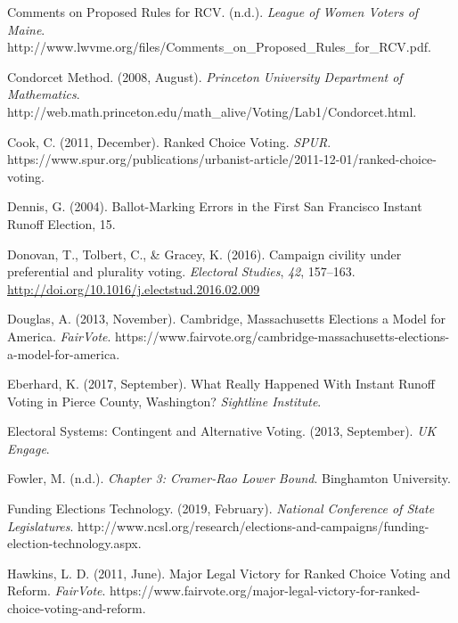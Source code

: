 \documentclass[12pt,twoside]{reedthesis}
\begin{document}
\leavevmode\hypertarget{ref-noauthor_comments_nodate}{}%
Comments on Proposed Rules for RCV. (n.d.). \emph{League of Women Voters of Maine}. http://www.lwvme.org/files/Comments\_on\_Proposed\_Rules\_for\_RCV.pdf.

\leavevmode\hypertarget{ref-noauthor_condorcet_2008}{}%
Condorcet Method. (2008, August). \emph{Princeton University Department of Mathematics}. http://web.math.princeton.edu/math\_alive/Voting/Lab1/Condorcet.html.

\leavevmode\hypertarget{ref-cook_ranked_2011}{}%
Cook, C. (2011, December). Ranked Choice Voting. \emph{SPUR}. https://www.spur.org/publications/urbanist-article/2011-12-01/ranked-choice-voting.

\leavevmode\hypertarget{ref-dennis_ballot-marking_2004}{}%
Dennis, G. (2004). Ballot-Marking Errors in the First San Francisco Instant Runoff Election, 15.

\leavevmode\hypertarget{ref-donovan_campaign_2016}{}%
Donovan, T., Tolbert, C., \& Gracey, K. (2016). Campaign civility under preferential and plurality voting. \emph{Electoral Studies}, \emph{42}, 157--163. \url{http://doi.org/10.1016/j.electstud.2016.02.009}

\leavevmode\hypertarget{ref-douglas_cambridge_2013}{}%
Douglas, A. (2013, November). Cambridge, Massachusetts Elections a Model for America. \emph{FairVote}. https://www.fairvote.org/cambridge-massachusetts-elections-a-model-for-america.

\leavevmode\hypertarget{ref-eberhard_what_2017}{}%
Eberhard, K. (2017, September). What Really Happened With Instant Runoff Voting in Pierce County, Washington? \emph{Sightline Institute}.

\leavevmode\hypertarget{ref-noauthor_electoral_2013}{}%
Electoral Systems: Contingent and Alternative Voting. (2013, September). \emph{UK Engage}.

\leavevmode\hypertarget{ref-fowler_chapter_2018}{}%
Fowler, M. (n.d.). \emph{Chapter 3: Cramer-Rao Lower Bound}. Binghamton University.

\leavevmode\hypertarget{ref-noauthor_funding_2019}{}%
Funding Elections Technology. (2019, February). \emph{National Conference of State Legislatures}. http://www.ncsl.org/research/elections-and-campaigns/funding-election-technology.aspx.

\leavevmode\hypertarget{ref-hawkins_major_2011}{}%
Hawkins, L. D. (2011, June). Major Legal Victory for Ranked Choice Voting and Reform. \emph{FairVote}. https://www.fairvote.org/major-legal-victory-for-ranked-choice-voting-and-reform.
\end{document}
